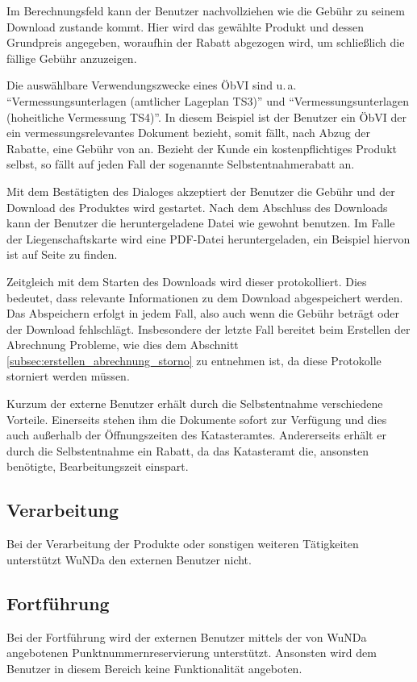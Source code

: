Im Berechnungsfeld kann der Benutzer nachvollziehen wie die Gebühr zu seinem Download zustande kommt. Hier wird das gewählte Produkt und dessen Grundpreis angegeben, woraufhin der Rabatt abgezogen wird, um schließlich die fällige Gebühr anzuzeigen.

Die auswählbare Verwendungszwecke eines \ac{ÖbVI} sind u.\,a. "`Vermessungsunterlagen (amtlicher Lageplan TS3)"' und "`Vermessungsunterlagen (hoheitliche Vermessung TS4)"'.
In diesem Beispiel ist der Benutzer ein \ac{ÖbVI} der ein vermessungsrelevantes Dokument bezieht, somit fällt, nach Abzug der Rabatte, eine Gebühr von  an.
Bezieht der Kunde ein kostenpflichtiges Produkt selbst, so fällt auf jeden Fall der sogenannte Selbstentnahmerabatt an. 

Mit dem Bestätigten des Dialoges akzeptiert der Benutzer die Gebühr und der Download des Produktes wird gestartet. Nach dem Abschluss des Downloads kann der Benutzer die heruntergeladene Datei wie gewohnt benutzen. Im Falle der Liegenschaftskarte wird eine PDF-Datei heruntergeladen, ein Beispiel hiervon ist auf Seite \pageref{fig:flurkarte} zu finden.

\label{subsec:beschaffung-download}
Zeitgleich mit dem Starten des Downloads wird dieser protokolliert. Dies bedeutet, dass relevante Informationen zu dem Download abgespeichert werden. Das Abspeichern erfolgt in jedem Fall, also auch wenn die Gebühr  beträgt oder der Download fehlschlägt. Insbesondere der letzte Fall bereitet beim Erstellen der Abrechnung Probleme, wie dies dem Abschnitt \vref{subsec:erstellen_abrechnung_storno} zu entnehmen ist, da diese Protokolle storniert werden müssen.
 
Kurzum der externe Benutzer erhält durch die Selbstentnahme verschiedene Vorteile.
Einerseits stehen ihm die Dokumente sofort zur Verfügung und dies auch außerhalb der Öffnungszeiten des Katasteramtes.
Andererseits erhält er durch die Selbstentnahme ein Rabatt, da das Katasteramt die, ansonsten benötigte, Bearbeitungszeit einspart.

\subsection{Verarbeitung}
Bei der Verarbeitung der Produkte oder sonstigen weiteren Tätigkeiten unterstützt \ac{WuNDa} den externen Benutzer nicht.

\subsection{Fortführung}
Bei der Fortführung wird der externen Benutzer mittels der von \ac{WuNDa} angebotenen Punktnummernreservierung unterstützt.
Ansonsten wird dem Benutzer in diesem Bereich keine Funktionalität angeboten.

